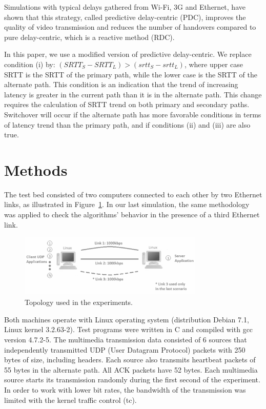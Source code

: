 \documentclass{sbrt2015}
\begin{document}
Simulations with typical delays gathered from Wi-Fi, 3G and Ethernet, have shown that this strategy, called predictive delay-centric (PDC), improves the quality of video transmission and reduces the number of handovers compared to pure delay-centric, which is a reactive method (RDC).

In this paper, we use a modified version of predictive delay-centric. We replace condition (i) by:
${(SRTT_S - SRTT_L) > (srtt_S - srtt_L)}$, where upper case SRTT is the SRTT of the primary path, while the lower case is the SRTT of the alternate path. This condition is an indication that the trend of increasing latency is greater in the current path than it is in the alternate path. This change requires the calculation of SRTT trend on both primary and secondary paths. Switchover will occur if the alternate path has more favorable conditions in terms of latency trend than the primary path, and if conditions (ii) and (iii) are also true. 

\section{Methods}

The test bed consisted of two computers connected to each other by two Ethernet links, as illustrated in Figure~\ref{topology}. In our last simulation, the same methodology was applied to check the algorithms' behavior in the presence of a third Ethernet link.

\begin{figure}[ht!]
\centering
\includegraphics[width=8.8cm,height=3cm]{figura1}
\caption{Topology used in the experiments.}
\label{topology}
\end{figure}

Both machines operate with Linux operating system (distribution Debian 7.1, Linux kernel 3.2.63-2). Test programs were written in C and compiled with gcc version 4.7.2-5. The multimedia transmission data consisted of 6 sources that independently transmitted UDP (User Datagram Protocol) packets with 250 bytes of size, including headers. Each source also transmits heartbeat packets of 55 bytes in the alternate path. All ACK packets have 52 bytes. Each multimedia source starts its transmission randomly during the first second of the experiment. In order to work with lower bit rates, the bandwidth of the transmission was limited with the kernel traffic control (tc). 
\end{document}
